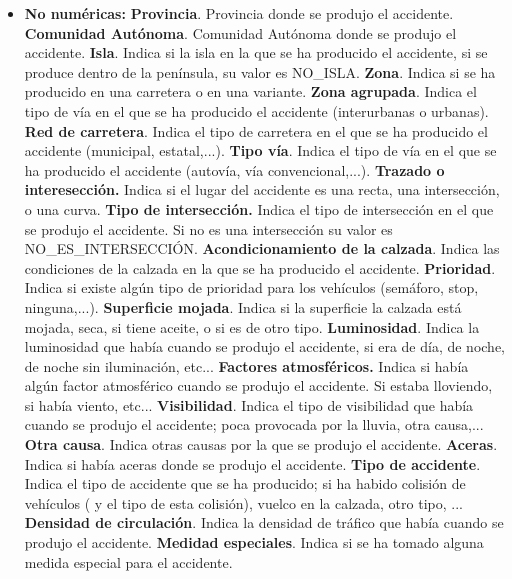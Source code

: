 \begin{itemize}
		
		\item \textbf{No numéricas:}
		\subitem \textbf{Provincia}. Provincia donde se produjo el accidente.
		\subitem \textbf{Comunidad Autónoma}. Comunidad Autónoma donde se produjo el accidente.
		\subitem \textbf{Isla}. Indica si la isla en la que se ha producido el accidente, si se produce dentro de la península, su valor es NO\_ISLA.
		\subitem \textbf{Zona}. Indica si se ha producido en una carretera o en una variante.
		\subitem \textbf{Zona agrupada}. Indica el tipo de vía en el que se ha producido el accidente (interurbanas o urbanas).
		\subitem \textbf{Red de carretera}. Indica el tipo de carretera en el que se ha producido el accidente (municipal, estatal,...).
		\subitem \textbf{Tipo vía}. Indica el tipo de vía en el que se ha producido el accidente (autovía, vía convencional,...).
		\subitem \textbf{Trazado o interesección.} Indica si el lugar del accidente es una recta, una intersección, o una curva.
		\subitem \textbf{Tipo de intersección.} Indica el tipo de intersección en el que se produjo el accidente. Si no es una intersección su valor es NO\_ES\_INTERSECCIÓN.
		\subitem \textbf{Acondicionamiento de la calzada}. Indica las condiciones de la calzada en la que se ha producido el accidente.
		\subitem \textbf{Prioridad}. Indica si existe algún tipo de prioridad para los vehículos (semáforo, stop, ninguna,...).
		\subitem \textbf{Superficie mojada}. Indica si la superficie la calzada está mojada, seca, si tiene aceite, o si es de otro tipo.
		\subitem \textbf{Luminosidad}. Indica la luminosidad que había cuando se produjo el accidente, si era de día, de noche, de noche sin iluminación, etc...
		\subitem \textbf{Factores atmosféricos.} Indica si había algún factor atmosférico cuando se produjo el accidente. Si estaba lloviendo, si había viento, etc...
		\subitem \textbf{Visibilidad}. Indica el tipo de visibilidad que había cuando se produjo el accidente; poca provocada por la lluvia, otra causa,...
		\subitem \textbf{Otra causa}. Indica otras causas por la que se produjo el accidente.
		\subitem \textbf{Aceras}. Indica si había aceras donde se produjo el accidente.
		\subitem \textbf{Tipo de accidente}. Indica el tipo de accidente que se ha producido; si ha habido colisión de vehículos ( y el tipo de esta colisión), vuelco en la calzada, otro tipo, ...
		\subitem \textbf{Densidad de circulación}. Indica la densidad de tráfico que había cuando se produjo el accidente.
		\subitem \textbf{Medidad especiales}. Indica si se ha tomado alguna medida especial para el accidente.
	\end{itemize}

